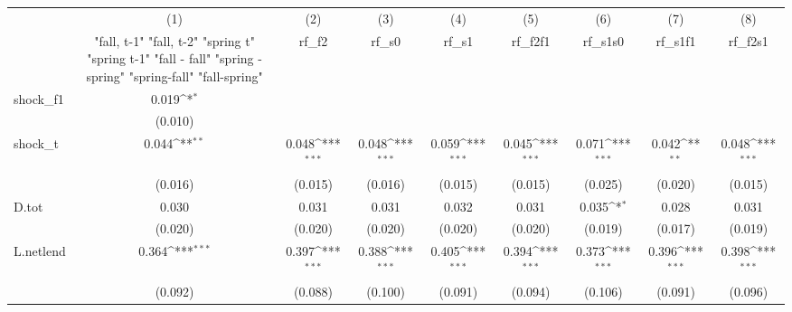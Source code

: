 {
\def\sym#1{\ifmmode^{#1}\else\(^{#1}\)\fi}
\begin{tabular}{l*{8}{c}}
\toprule
            &\multicolumn{1}{c}{(1)}&\multicolumn{1}{c}{(2)}&\multicolumn{1}{c}{(3)}&\multicolumn{1}{c}{(4)}&\multicolumn{1}{c}{(5)}&\multicolumn{1}{c}{(6)}&\multicolumn{1}{c}{(7)}&\multicolumn{1}{c}{(8)}\\
            &\multicolumn{1}{c}{  "fall, t-1" "fall, t-2" "spring t" "spring t-1"  "fall - fall" "spring - spring" "spring-fall" "fall-spring" }&\multicolumn{1}{c}{rf\_f2}&\multicolumn{1}{c}{rf\_s0}&\multicolumn{1}{c}{rf\_s1}&\multicolumn{1}{c}{rf\_f2f1}&\multicolumn{1}{c}{rf\_s1s0}&\multicolumn{1}{c}{rf\_s1f1}&\multicolumn{1}{c}{rf\_f2s1}\\
\midrule
shock\_f1    &       0.019\sym{*}  &                     &                     &                     &                     &                     &                     &                     \\
            &     (0.010)         &                     &                     &                     &                     &                     &                     &                     \\
\addlinespace
shock\_t     &       0.044\sym{**} &       0.048\sym{***}&       0.048\sym{***}&       0.059\sym{***}&       0.045\sym{***}&       0.071\sym{***}&       0.042\sym{**} &       0.048\sym{***}\\
            &     (0.016)         &     (0.015)         &     (0.016)         &     (0.015)         &     (0.015)         &     (0.025)         &     (0.020)         &     (0.015)         \\
\addlinespace
D.tot       &       0.030         &       0.031         &       0.031         &       0.032         &       0.031         &       0.035\sym{*}  &       0.028         &       0.031         \\
            &     (0.020)         &     (0.020)         &     (0.020)         &     (0.020)         &     (0.020)         &     (0.019)         &     (0.017)         &     (0.019)         \\
\addlinespace
L.netlend   &       0.364\sym{***}&       0.397\sym{***}&       0.388\sym{***}&       0.405\sym{***}&       0.394\sym{***}&       0.373\sym{***}&       0.396\sym{***}&       0.398\sym{***}\\
            &     (0.092)         &     (0.088)         &     (0.100)         &     (0.091)         &     (0.094)         &     (0.106)         &     (0.091)         &     (0.096)         \\

\end{tabular}}
